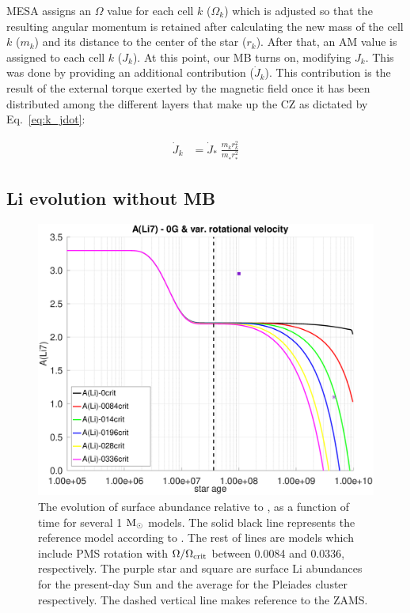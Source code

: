 \documentclass[fleqn,usenatbib]{mnras}
\begin{document}
MESA assigns an $\Omega$ value for each cell $k$ ($\Omega_k$) which is adjusted so that the resulting angular momentum is retained after calculating the new mass of the cell $k$ ($m_k$) and its distance to the center of the star ($r_k$). After that, an AM value is assigned to each cell $k$ ($J_k$). At this point, our MB turns on, modifying $J_k$. This was done by providing an additional contribution ($\Dot{J}_{k}$). This contribution is the result of the external torque exerted by the magnetic field once it has been distributed among the different layers that make up the CZ as dictated by Eq.~\ref{eq:k_jdot}:\par
 
\begin{ceqn}
\begin{align}
    \Dot{J}_{k} &= \Dot{J}_*\;\frac{m^{}_{k} r^2_{k}}{m^{}_* r_*^2} \label{eq:k_jdot}
\end{align}
\end{ceqn}


\subsection{Li evolution without MB}

\begin{figure}
	\includegraphics[trim = 25mm 10mm 15mm 10mm, clip, width=\columnwidth]{figures/li_var_vel_0_0g.eps}
    \caption{The evolution of surface  abundance relative to , as a function of time for several 1 $\mathrm{M}_\odot$ models. The solid black line represents the reference model according to \citet{Choi2016}. The rest of lines are models which include PMS rotation with $\Omega / \Omega_{\mathrm{crit}}$ between 0.0084 and 0.0336, respectively. The purple star and square are surface Li abundances for the present-day Sun \citep{Asplund2009} and the average for the Pleiades cluster \citep{Sestito2005} respectively. The dashed vertical line makes reference to the ZAMS.}
    \label{fig:li_var_vel_0g}
\end{figure}
\end{document}
